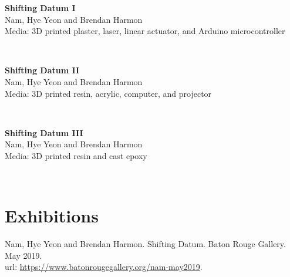 \documentclass[]{baharmon_cv}
\begin{document}
\begin{minipage}[t]{0.85\textwidth}
\textbf{Shifting Datum I}\\
Nam, Hye Yeon and Brendan Harmon\\
Media: 3D printed plaster, laser, linear actuator, and Arduino microcontroller\\
\end{minipage}
\begin{minipage}[t]{0.15\textwidth} 
\end{minipage}\\

\begin{minipage}[t]{0.85\textwidth}
\textbf{Shifting Datum II}\\
Nam, Hye Yeon and Brendan Harmon\\
Media: 3D printed resin, acrylic, computer, and projector\\
\end{minipage}
\begin{minipage}[t]{0.15\textwidth} 
\end{minipage}\\

\begin{minipage}[t]{0.85\textwidth}
\textbf{Shifting Datum III}\\
Nam, Hye Yeon and Brendan Harmon\\
Media: 3D printed resin and cast epoxy\\
\end{minipage}
\begin{minipage}[t]{0.15\textwidth} 
\end{minipage}\\

\sectiondivider \linebreak


\section{Exhibitions} 

Nam, Hye Yeon and Brendan Harmon. Shifting Datum. Baton Rouge Gallery. May 2019.\\
url: \url{https://www.batonrougegallery.org/nam-may2019}.\\

\end{document}
